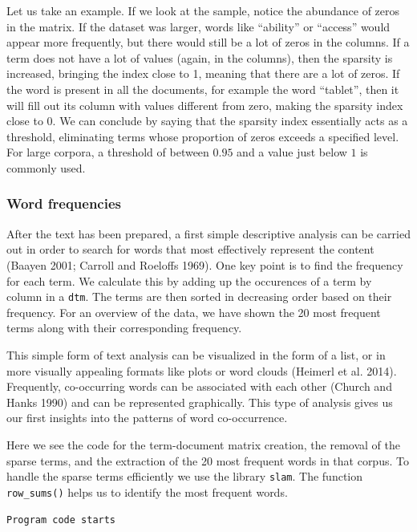 Let us take an example. If we look at the sample, notice the abundance of
zeros in the matrix. If the dataset was larger, words like ``ability''
or ``access'' would appear more frequently, but there would still be a lot of zeros in the columns. If a term does not have a lot of values
(again, in the columns), then the sparsity is increased, bringing the index
close to 1, meaning that there are a lot of zeros. If the word is
present in all the documents, for example the word ``tablet'', then
it will fill out its column with values different from zero, making the
sparsity index close to 0. We can conclude by saying that the sparsity
index essentially acts as a threshold, eliminating terms whose
proportion of zeros exceeds a specified level. For large corpora, a
threshold of between \(0.95\) and a value just below \(1\) is commonly
used.

\subsubsection{Word frequencies}\label{word-frequencies}

After the text has been prepared, a first simple descriptive analysis can be
carried out in order to search for words that most effectively represent
the content (Baayen 2001; Carroll and Roeloffs 1969). One key point is
to find the frequency for each term. We calculate this by adding up the occurences of a
term by column in a \texttt{dtm}. The terms are then
sorted in decreasing order based on their frequency. For an overview of
the data, we have shown the 20 most frequent terms along with their
corresponding frequency.

This simple form of text analysis can be visualized in the form of a
list, or in more visually appealing formats like plots or word clouds
(Heimerl et al. 2014). Frequently, co-occurring words can be associated
with each other (Church and Hanks 1990) and can be
represented graphically. This type of analysis gives us our first insights into the
patterns of word co-occurrence.

Here we see the code for the term-document matrix creation, the removal of
the sparse terms, and the extraction of the 20 most frequent words in
that corpus. To handle the sparse terms efficiently we use the library
\texttt{slam}. The function \texttt{row\_sums()} helps us to identify the
most frequent words.

\texttt{Program\ code\ starts}

